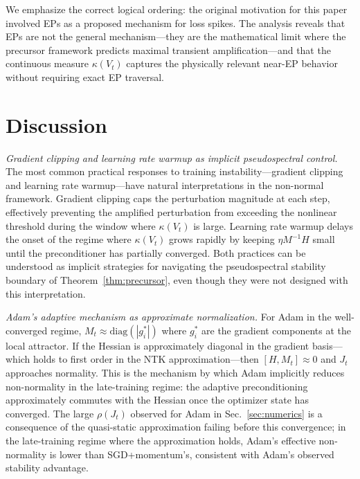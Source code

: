 \documentclass[aps,prresearch,twocolumn,superscriptaddress,longbibliography]{revtex4-2}
\newcommand{\diag}{\mathrm{diag}}
\begin{document}
We emphasize the correct logical ordering: the original motivation for
this paper involved EPs as a proposed mechanism for loss spikes.
The analysis reveals that EPs are not the general mechanism---they are
the mathematical limit where the precursor framework predicts maximal
transient amplification---and that the continuous measure $\kappa(V_t)$
captures the physically relevant near-EP behavior without requiring exact
EP traversal.

\section{Discussion}
\label{sec:discussion}

\emph{Gradient clipping and learning rate warmup as implicit
pseudospectral control.}
The most common practical responses to training instability---gradient
clipping and learning rate warmup---have natural interpretations in the
non-normal framework.
Gradient clipping caps the perturbation magnitude at each step,
effectively preventing the amplified perturbation from exceeding the
nonlinear threshold during the window where $\kappa(V_t)$ is large.
Learning rate warmup delays the onset of the regime where $\kappa(V_t)$
grows rapidly by keeping $\eta M^{-1}H$ small until the preconditioner
has partially converged.
Both practices can be understood as implicit strategies for navigating
the pseudospectral stability boundary of Theorem~\ref{thm:precursor},
even though they were not designed with this interpretation.

\emph{Adam's adaptive mechanism as approximate normalization.}
For Adam in the well-converged regime,
$M_t\approx\diag(|g_i^*|)$ where $g_i^*$ are the gradient components
at the local attractor.
If the Hessian is approximately diagonal in the gradient basis---which
holds to first order in the NTK approximation---then
$[H,M_t]\approx 0$ and $J_t$ approaches normality.
This is the mechanism by which Adam implicitly reduces non-normality in
the late-training regime: the adaptive preconditioning approximately
commutes with the Hessian once the optimizer state has converged.
The large $\rho(J_t)$ observed for Adam in Sec.~\ref{sec:numerics} is
a consequence of the quasi-static approximation failing before this
convergence; in the late-training regime where the approximation holds,
Adam's effective non-normality is lower than SGD+momentum's, consistent
with Adam's observed stability advantage.
\end{document}
